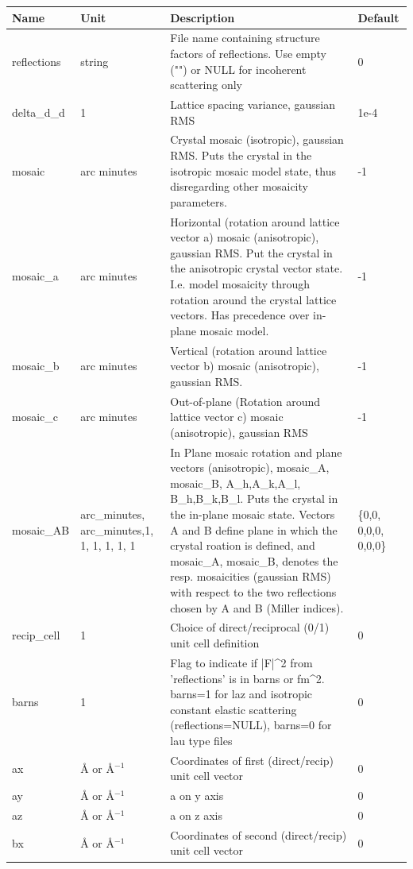 \begin{longtable}{p{}p{}p{}p{}}
\toprule
\textbf{Name} & \textbf{Unit} & \textbf{Description} & \textbf{Default} \\
\midrule
\endhead
reflections & string & File name containing structure factors of reflections. Use empty ("") or NULL for incoherent scattering only & 0 \\
delta\_d\_d & 1 & Lattice spacing variance, gaussian RMS & 1e-4 \\
mosaic & arc minutes & Crystal mosaic (isotropic), gaussian RMS. Puts the crystal in the isotropic mosaic model state, thus disregarding other mosaicity parameters. & -1 \\
mosaic\_a & arc minutes & Horizontal (rotation around lattice vector a) mosaic (anisotropic), gaussian RMS. Put the crystal in the anisotropic crystal vector state. I.e. model mosaicity through rotation around the crystal lattice vectors. Has precedence over in-plane mosaic model. & -1 \\
mosaic\_b & arc minutes & Vertical (rotation around lattice vector b) mosaic (anisotropic), gaussian RMS. & -1 \\
mosaic\_c & arc minutes & Out-of-plane (Rotation around lattice vector c) mosaic (anisotropic), gaussian RMS & -1 \\
mosaic\_AB & arc\_minutes, arc\_minutes,1, 1, 1, 1, 1, 1 & In Plane mosaic rotation and plane vectors (anisotropic), mosaic\_A, mosaic\_B, A\_h,A\_k,A\_l, B\_h,B\_k,B\_l. Puts the crystal in the in-plane mosaic state. Vectors A and B define plane in which  the crystal roation is defined, and mosaic\_A, mosaic\_B, denotes the resp. mosaicities (gaussian RMS) with respect to the two reflections chosen by A and B (Miller indices). & \{0,0, 0,0,0, 0,0,0\} \\
recip\_cell & 1 & Choice of direct/reciprocal (0/1) unit cell definition & 0 \\
barns & 1 & Flag to indicate if |F|\textasciicircum{}2 from 'reflections' is in barns or fm\textasciicircum{}2. barns=1 for laz and isotropic constant elastic scattering (reflections=NULL), barns=0 for lau type files & 0 \\
ax & \AA{} or \AA{}$^{-1}$ & Coordinates of first (direct/recip) unit cell vector & 0 \\
ay & \AA{} or \AA{}$^{-1}$ & a on y axis & 0 \\
az & \AA{} or \AA{}$^{-1}$ & a on z axis & 0 \\
bx & \AA{} or \AA{}$^{-1}$ & Coordinates of second (direct/recip) unit cell vector & 0 \\

\end{longtable}
